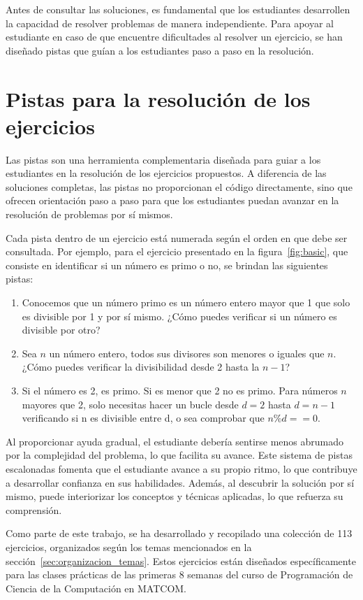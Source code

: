 \documentclass{article}
\begin{document}
Antes de consultar las soluciones, es fundamental que los estudiantes desarrollen la capacidad de resolver problemas de manera independiente. Para apoyar al estudiante en caso de que encuentre dificultades al resolver un ejercicio, se han diseñado pistas que guían a los estudiantes paso a paso en la resolución.

\section{Pistas para la resolución de los ejercicios}

Las pistas son una herramienta complementaria diseñada para guiar a los estudiantes en la resolución de los ejercicios propuestos. A diferencia de las soluciones completas, las pistas no proporcionan el código directamente, sino que ofrecen orientación paso a paso para que los estudiantes puedan avanzar en la resolución de problemas por sí mismos. 

Cada pista dentro de un ejercicio está numerada según el orden en que debe ser consultada. Por ejemplo, para el ejercicio presentado en la figura~\ref{fig:basic}, que consiste en identificar si un número es primo o no, se brindan las siguientes pistas:
\begin{enumerate}
    \item Conocemos que un número primo es un número entero mayor que 1 que solo es divisible por 1 y por sí mismo. ¿Cómo puedes verificar si un número es divisible por otro?
    \item Sea \(n\) un número entero, todos sus divisores son menores o iguales que \(n\). ¿Cómo puedes verificar la divisibilidad desde 2 hasta la \(n - 1\)?
    \item Si el número es 2, es primo. Si es menor que 2 no es primo. Para números \(n\) mayores que 2, solo necesitas hacer un bucle desde \(d = 2\) hasta \(d = n -1\) verificando si n es divisible entre d, o sea comprobar que \(n \% d == 0\).
\end{enumerate}

Al proporcionar ayuda gradual, el estudiante debería sentirse menos abrumado por la complejidad del problema, lo que facilita su avance. Este sistema de pistas escalonadas fomenta que el estudiante avance a su propio ritmo, lo que contribuye a desarrollar confianza en sus habilidades. Además, al descubrir la solución por sí mismo, puede interiorizar los conceptos y técnicas aplicadas, lo que refuerza su comprensión.

Como parte de este trabajo, se ha desarrollado y recopilado una colección de 113 ejercicios, organizados según los temas mencionados en la sección~\ref{sec:organizacion_temas}. Estos ejercicios están diseñados específicamente para las clases prácticas de las primeras 8 semanas del curso de Programación de Ciencia de la Computación en \mbox{MATCOM}.
\end{document}
